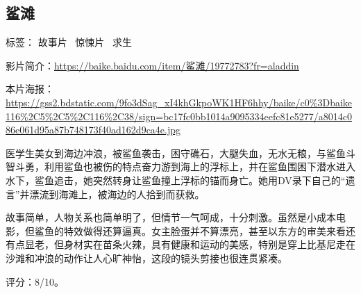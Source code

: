 \subsection{鲨滩}

标签： 故事片 \  惊悚片 \  求生

影片简介：\url{https://baike.baidu.com/item/鲨滩/19772783?fr=aladdin}

本片海报：\url{https://gss2.bdstatic.com/9fo3dSag_xI4khGkpoWK1HF6hhy/baike/c0\%3Dbaike116\%2C5\%2C5\%2C116\%2C38/sign=bc17fc0bb1014a9095334eefc81e5277/a8014c086e061d95a87b748173f40ad162d9ca4e.jpg}

医学生美女到海边冲浪，被鲨鱼袭击，困守礁石，大腿失血，无水无粮，与鲨鱼斗智斗勇，利用鲨鱼也被伤的特点奋力游到海上的浮标上，并在鲨鱼围困下潜水进入水下，鲨鱼追击，她突然转身让鲨鱼撞上浮标的锚而身亡。她用DV录下自己的“遗言”并漂流到海滩上，被海边的人拾到而获救。

故事简单，人物关系也简单明了，但情节一气呵成，十分刺激。虽然是小成本电影，但鲨鱼的特效做得还算逼真。女主脸蛋并不算漂亮，甚至以东方的审美来看还有点显老，但身材实在苗条火辣，具有健康和运动的美感，特别是穿上比基尼走在沙滩和冲浪的动作让人心旷神怡，这段的镜头剪接也很连贯紧凑。

评分：8/10。
